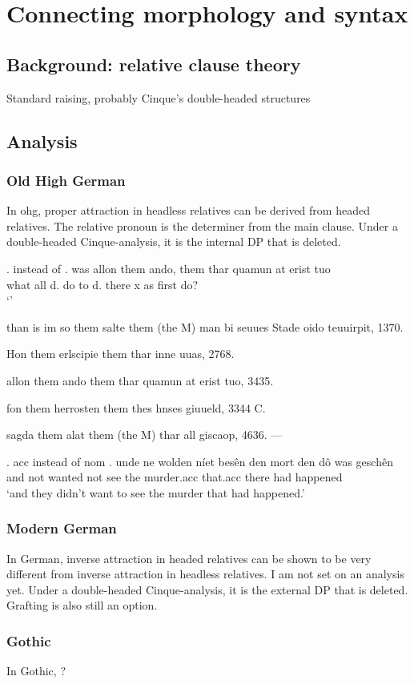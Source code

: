 
\chapter{Connecting morphology and syntax}\label{ch:connecting}


\section{Background: relative clause theory}
Standard raising, probably Cinque's double-headed structures

\section{Analysis}

\subsection{Old High German}
In \ac{ohg}, proper attraction in headless relatives can be derived from headed relatives. The relative pronoun is the determiner from the main clause. Under a double-headed Cinque-analysis, it is the internal DP that is deleted.


\ex.  instead of 
\ag. was allon them ando, them thar quamun at erist tuo\\
 what all d. {do to} d. there x as first do?\\
 `'



than is im so them salte them (the M) man bi seuues Stade
oido teuuirpit, 1370.

Hon them erlscipie them thar inne uuas, 2768.

allon them ando them thar quamun at erist tuo, 3435.

fon them herrosten them thes hnses giuueld, 3344 C.

sagda them alat them (the M) thar all giscaop, 4636. —



\ex. \ac{acc} instead of \ac{nom}
\ag. unde ne wolden níet besên den mort den dô was geschên\\
 and not wanted not see the murder.\ac{acc} that.\ac{acc} there had happened\\
 `and they didn't want to see the murder that had happened.' 



\subsection{Modern German}
In German, inverse attraction in headed relatives can be shown to be very different from inverse attraction in headless relatives. I am not set on an analysis yet. Under a double-headed Cinque-analysis, it is the external DP that is deleted. Grafting is also still an option.


\subsection{Gothic}
In Gothic, ?
